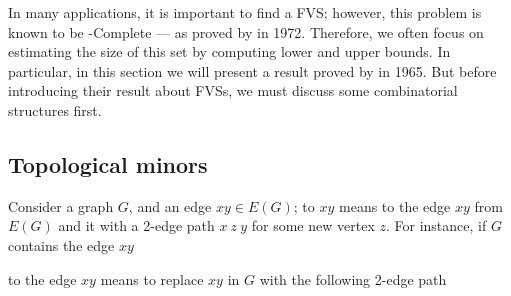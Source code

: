 \documentclass[a4paper, 12pt]{report}
\begin{document}
    In many applications, it is important to find a  FVS; however, this problem is known to be \NPclass-Complete --- as proved by \textcite{karp} in 1972. Therefore, we often focus on estimating the size of this set by computing lower and upper bounds. In particular, in this section we will present a result proved by \textcite{erdos} in 1965. But before introducing their result about FVSs, we must discuss some combinatorial structures first.

    \subsection{Topological minors}

    Consider a graph $G$, and an edge $xy \in E(G)$; to  $xy$ means to  the edge $xy$ from $E(G)$ and  it with a 2-edge path $x \ z \ y$ for some new vertex $z$. For instance, if $G$ contains the edge $xy$

    \begin{figure}[H]
        \centering
    \end{figure}

    to  the edge $xy$ means to replace $xy$ in $G$ with the following 2-edge path

    \begin{figure}[H]
        \centering
    \end{figure}
\end{document}
